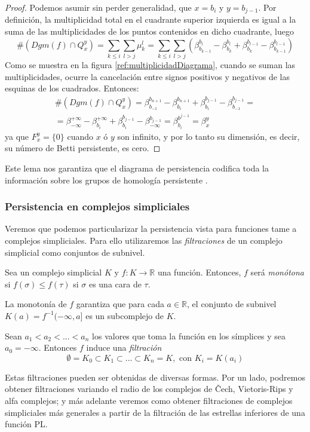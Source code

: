 \begin{proof}
Podemos asumir sin perder generalidad, que $x = b_i$ y $y = b_{j-1}$. Por definición, la multiplicidad total en el cuadrante superior izquierda es igual a la suma de las multiplicidades de los puntos contenidos en dicho cuadrante, luego
\[
\#(Dgm(f) \cap Q_{x}^{y}) = \sum_{k \leq i} \sum_{l > j}  \mu_{k}^{l} =
\sum_{k \leq i} \sum_{l > j} (\beta_{b_{k-1}}^{b_l} - \beta_{b_k}^{b_l} + \beta_{b_k}^{b_{l-1}} - \beta_{b_{k-1}}^{b_{l-1}})
\]
Como se muestra en la figura \ref{ref:multiplicidadDiagrama}, cuando se suman las multiplicidades, ocurre la cancelación entre signos positivos y negativos de las esquinas de los cuadrados. Entonces:
\begin{gather*}
\#(Dgm(f) \cap Q_{x}^{y}) = \beta_{b_{-1}}^{b_{n+1}} - \beta_{b_{i}}^{b_{n+1}} + \beta_{b_i}^{b_{j-1}} - \beta_{b_{-1}}^{b_{j-1}} =\\
= \beta_{-\infty}^{+\infty} - \beta_{b_{i}}^{+\infty} + \beta_{b_i}^{b_{j-1}} - \beta_{-\infty}^{b_{j-1}} = \beta_{b_i}^{b^{j-1}} = \beta_{x}^{y}
\end{gather*}
ya que $F_{x}^{y}= \{0\}$ cuando $x$ ó $y$ son infinito, y por lo tanto su dimensión, es decir, su número de Betti persistente, es cero.
\end{proof}

Este lema nos garantiza que el diagrama de persistencia codifica toda la información sobre los grupos de homología persistente \cite{libroEH}.

\subsubsection*{Persistencia en complejos simpliciales}
Veremos que podemos particularizar la persistencia vista para funciones tame a complejos simpliciales. Para ello utilizaremos las \emph{filtraciones} de un complejo simplicial como conjuntos de subnivel.

\begin{definition}
Sea un complejo simplicial $K$ y $f: K \to \mathbb{R}$ una función. Entonces, $f$ será \emph{monótona} si $f(\sigma) \leq f(\tau)$ si $\sigma$ es una cara de $\tau$.
\end{definition}
\begin{sloppypar}
La monotonía de $f$ garantiza que para cada $a \in \mathbb{R}$, el conjunto de subnivel ${K(a) = f^{-1}(-\infty,a]}$ es un subcomplejo de $K$.
\end{sloppypar}


\begin{definition}
Sean $a_1 < a_2 < ... < a_n$ los valores que toma la función en los símplices y sea $a_0 = -\infty$. Entonces $f$ induce una \emph{filtración}
\[
\emptyset = K_0 \subset K_1 \subset ... \subset K_n = K, \text{ con } K_i=K(a_i)
\]
\end{definition}
Estas filtraciones pueden ser obtenidas de diversas formas. Por un lado, podremos obtener filtraciones variando el radio de los complejos de \v{C}ech, Vietoris-Rips y alfa complejos; y más adelante veremos como obtener filtraciones de complejos simpliciales más generales a partir de la filtración de las estrellas inferiores de una función PL.


